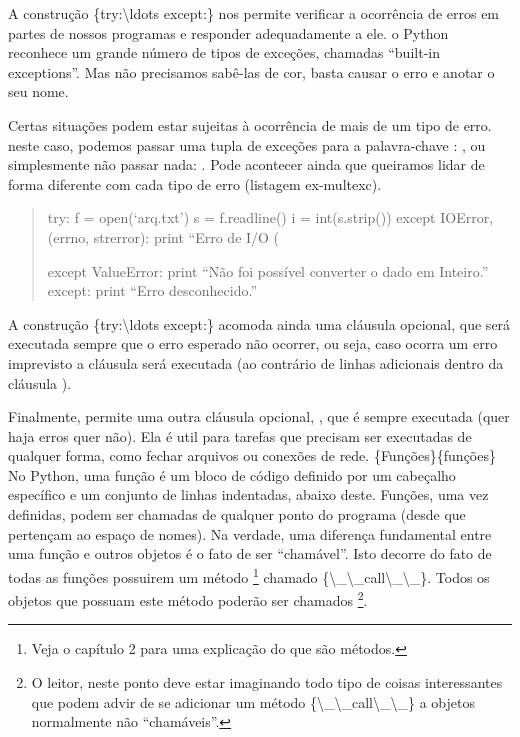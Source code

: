 \documentclass[a4paper,10pt,brazil]{sphinxmanual}
\begin{document}
A construção \{try:\textbackslash{}ldots except:\} nos permite verificar a
ocorrência de erros em partes de nossos programas e responder
adequadamente a ele. o Python reconhece um grande número de tipos
de exceções, chamadas ``built-in exceptions''. Mas não precisamos
sabê-las de cor, basta causar o erro e anotar o seu nome.

Certas situações podem estar sujeitas à ocorrência de mais de um
tipo de erro. neste caso, podemos passar uma tupla de exceções para
a palavra-chave :
, ou simplesmente
não passar nada: . Pode acontecer ainda que
queiramos lidar de forma diferente com cada tipo de erro (listagem
ex-multexc).
\begin{quote}

try: f = open(`arq.txt') s = f.readline() i = int(s.strip()) except
IOError, (errno, strerror): print ``Erro de I/O (

except ValueError: print ``Não foi possível converter o dado em
Inteiro.'' except: print ``Erro desconhecido.''
\end{quote}

A construção \{try:\textbackslash{}ldots except:\} acomoda ainda uma cláusula
 opcional, que será executada sempre que o erro esperado
não ocorrer, ou seja, caso ocorra um erro imprevisto a cláusula
 será executada (ao contrário de linhas adicionais dentro
da cláusula ).

Finalmente,  permite uma outra cláusula opcional,
, que é sempre executada (quer haja erros quer não). Ela
é util para tarefas que precisam ser executadas de qualquer forma,
como fechar arquivos ou conexões de rede. \{Funções\}\{funções\} No
Python, uma função é um bloco de código definido por um cabeçalho
específico e um conjunto de linhas indentadas, abaixo deste.
Funções, uma vez definidas, podem ser chamadas de qualquer ponto do
programa (desde que pertençam ao espaço de nomes). Na verdade, uma
diferença fundamental entre uma função e outros objetos é o fato de
ser ``chamável''. Isto decorre do fato de todas as funções possuirem
um método \footnote{
Veja o capítulo 2 para uma explicação do que são métodos.
} chamado \{\textbackslash{}\_\textbackslash{}\_call\textbackslash{}\_\textbackslash{}\_\}. Todos os objetos que
possuam este método poderão ser chamados \footnote{
O leitor, neste ponto deve estar imaginando todo tipo de coisas
interessantes que podem advir de se adicionar um método
\{\textbackslash{}\_\textbackslash{}\_call\textbackslash{}\_\textbackslash{}\_\} a objetos normalmente não ``chamáveis''.
}.
\end{document}
